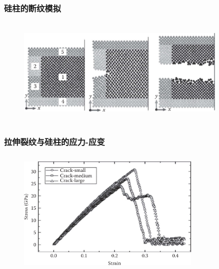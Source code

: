 \frame
{
	\frametitle{硅柱的断纹模拟}
\begin{figure}[h!]
\centering
\vskip -15pt
\includegraphics[height=2.10in,width=4.0in, viewport=0 0 1050 500,clip]{Figures/Lammps_tutorial-14-Si_crack-initiating-block_under_tension.png}
\caption{\fontsize{6.2pt}{5.2pt}}%
\label{LAMMPS_Si_bar-Crack-initiating_block_under_tension}
\end{figure}
}

\frame
{
	\frametitle{拉伸裂纹与硅柱的应力-应变}
\begin{figure}[h!]
\centering
\vskip -5pt
\includegraphics[height=2.40in,width=3.5in, viewport=0 0 1000 620,clip]{Figures/Lammps_tutorial-14-Stress_strain-curves-Si_crack-initiating-block_under_tension.png}
\caption{\fontsize{6.2pt}{5.2pt}}%
\label{LAMMPS_Stress_strain-of-Si_bar-with-various_initial_crack_sizes}
\end{figure}
}

